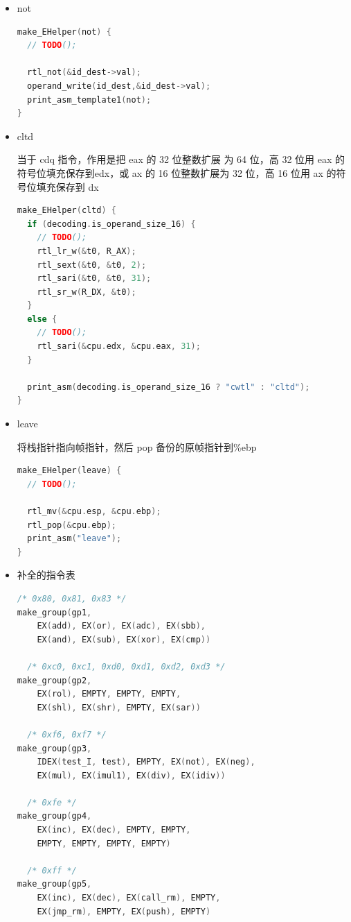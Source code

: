 \documentclass[UTF8,a4paper,10pt]{ctexart}
\begin{document}
\begin{itemize}
\begin{lstlisting}[language = C]
  rtl_or(&t2,&id_dest->val,&id_src->val);
  operand_write(id_dest,&t2);
  rtl_update_ZFSF(&t2,id_dest->width);
  rtl_set_CF(&tzero);
  rtl_set_OF(&tzero);
  print_asm_template2(or);

  print_asm_template2(or);
}
\end{lstlisting}
\item not 
\begin{lstlisting}[language = C]
make_EHelper(not) {
  // TODO();

  rtl_not(&id_dest->val);
  operand_write(id_dest,&id_dest->val);
  print_asm_template1(not);
}
\end{lstlisting}
\item cltd 

当于 cdq 指令，作用是把 eax 的 32 位整数扩展 为 64 位，高 32 位用 eax 的符号位填充保存到edx，或 ax 的 16 位整数扩展为 32 位，高 16 位用 ax 的符号位填充保存到 dx
\begin{lstlisting}[language = C]
make_EHelper(cltd) {
  if (decoding.is_operand_size_16) {
    // TODO();
    rtl_lr_w(&t0, R_AX);
    rtl_sext(&t0, &t0, 2);
    rtl_sari(&t0, &t0, 31);
    rtl_sr_w(R_DX, &t0);
  }
  else {
    // TODO();
    rtl_sari(&cpu.edx, &cpu.eax, 31);
  }

  print_asm(decoding.is_operand_size_16 ? "cwtl" : "cltd");
}
\end{lstlisting}
\item leave

将栈指针指向帧指针，然后 pop 备份的原帧指针到\%ebp
\begin{lstlisting}[language = C]
make_EHelper(leave) {
  // TODO();

  rtl_mv(&cpu.esp, &cpu.ebp);
  rtl_pop(&cpu.ebp);
  print_asm("leave");
}
\end{lstlisting}
\item 补全的指令表
\begin{lstlisting}[language = C]
  /* 0x80, 0x81, 0x83 */
make_group(gp1,
    EX(add), EX(or), EX(adc), EX(sbb),
    EX(and), EX(sub), EX(xor), EX(cmp))

  /* 0xc0, 0xc1, 0xd0, 0xd1, 0xd2, 0xd3 */
make_group(gp2,
    EX(rol), EMPTY, EMPTY, EMPTY,
    EX(shl), EX(shr), EMPTY, EX(sar))

  /* 0xf6, 0xf7 */
make_group(gp3,
    IDEX(test_I, test), EMPTY, EX(not), EX(neg),
    EX(mul), EX(imul1), EX(div), EX(idiv))

  /* 0xfe */
make_group(gp4,
    EX(inc), EX(dec), EMPTY, EMPTY,
    EMPTY, EMPTY, EMPTY, EMPTY)

  /* 0xff */
make_group(gp5,
    EX(inc), EX(dec), EX(call_rm), EMPTY,
    EX(jmp_rm), EMPTY, EX(push), EMPTY)


\end{lstlisting}
\end{itemize}
\end{document}
